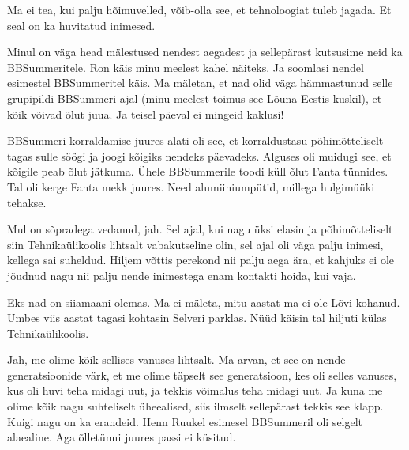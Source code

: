 
Ma ei tea, kui palju hõimuvelled, võib-olla see, et tehnoloogiat tuleb jagada. 
Et seal on ka huvitatud inimesed. 

Minul on väga head mälestused nendest aegadest ja sellepärast kutsusime neid ka 
 BBSummeritele. Ron käis minu meelest kahel näiteks. Ja 
soomlasi nendel esimestel BBSummeritel käis. Ma mäletan, et nad olid väga 
hämmastunud selle grupipildi-BBSummeri ajal (minu meelest toimus see 
Lõuna-Eestis kuskil), et kõik võivad õlut juua. Ja teisel päeval ei mingeid 
kaklusi!

BBSummeri korraldamise juures alati oli see, et korraldustasu  põhimõtteliselt 
tagas sulle söögi ja joogi kõigiks nendeks päevadeks. Alguses oli muidugi see, 
et kõigile peab õlut jätkuma. Ühele BBSummerile toodi küll õlut Fanta tünnides. 
Tal oli kerge Fanta mekk juures. Need alumiiniumpütid, millega hulgimüüki 
tehakse. 


Mul on sõpradega vedanud, jah. Sel ajal, kui  nagu üksi elasin ja 
põhimõtteliselt siin Tehnikaülikoolis lihtsalt 
vabakutseline olin, sel ajal oli väga palju inimesi, kellega sai suheldud. 
Hiljem võttis perekond nii palju aega ära, et kahjuks ei ole jõudnud nagu nii 
palju nende inimestega enam kontakti hoida, kui vaja.


Eks nad on siiamaani olemas. Ma ei mäleta, mitu aastat ma ei ole 
Lõvi kohanud. Umbes viis aastat tagasi kohtasin Selveri 
parklas. Nüüd käisin tal hiljuti külas Tehnikaülikoolis.


Jah, me olime kõik sellises vanuses lihtsalt. Ma arvan, et see on nende 
generatsioonide värk, et me olime täpselt see generatsioon, kes oli selles 
vanuses, kus oli huvi teha midagi uut, ja tekkis võimalus teha midagi uut. Ja 
kuna me olime kõik nagu suhteliselt üheealised, siis ilmselt sellepärast tekkis 
see klapp. Kuigi nagu on ka erandeid. Henn Ruukel 
esimesel BBSummeril oli selgelt alaealine. Aga õlletünni juures passi ei 
küsitud.

